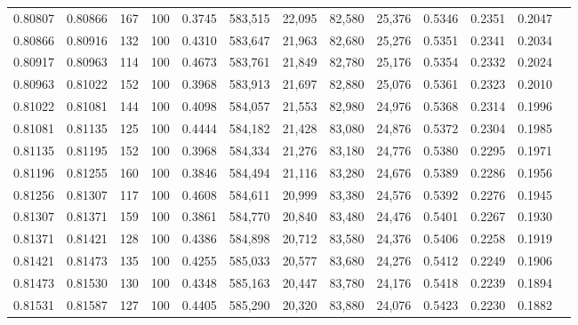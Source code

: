 \begin{tabular}{rrrrrrrrrrrrr}
0.80807 & 0.80866 &   167 & 100 &                                     0.3745 & 583,515 &  22,095 &  82,580 &  25,376 & 0.5346 & 0.2351 & 0.2047 \\
0.80866 & 0.80916 &   132 & 100 &                                     0.4310 & 583,647 &  21,963 &  82,680 &  25,276 & 0.5351 & 0.2341 & 0.2034 \\
0.80917 & 0.80963 &   114 & 100 &                                     0.4673 & 583,761 &  21,849 &  82,780 &  25,176 & 0.5354 & 0.2332 & 0.2024 \\
0.80963 & 0.81022 &   152 & 100 &                                     0.3968 & 583,913 &  21,697 &  82,880 &  25,076 & 0.5361 & 0.2323 & 0.2010 \\
0.81022 & 0.81081 &   144 & 100 &                                     0.4098 & 584,057 &  21,553 &  82,980 &  24,976 & 0.5368 & 0.2314 & 0.1996 \\
0.81081 & 0.81135 &   125 & 100 &                                     0.4444 & 584,182 &  21,428 &  83,080 &  24,876 & 0.5372 & 0.2304 & 0.1985 \\
0.81135 & 0.81195 &   152 & 100 &                                     0.3968 & 584,334 &  21,276 &  83,180 &  24,776 & 0.5380 & 0.2295 & 0.1971 \\
0.81196 & 0.81255 &   160 & 100 &                                     0.3846 & 584,494 &  21,116 &  83,280 &  24,676 & 0.5389 & 0.2286 & 0.1956 \\
0.81256 & 0.81307 &   117 & 100 &                                     0.4608 & 584,611 &  20,999 &  83,380 &  24,576 & 0.5392 & 0.2276 & 0.1945 \\
0.81307 & 0.81371 &   159 & 100 &                                     0.3861 & 584,770 &  20,840 &  83,480 &  24,476 & 0.5401 & 0.2267 & 0.1930 \\
0.81371 & 0.81421 &   128 & 100 &                                     0.4386 & 584,898 &  20,712 &  83,580 &  24,376 & 0.5406 & 0.2258 & 0.1919 \\
0.81421 & 0.81473 &   135 & 100 &                                     0.4255 & 585,033 &  20,577 &  83,680 &  24,276 & 0.5412 & 0.2249 & 0.1906 \\
0.81473 & 0.81530 &   130 & 100 &                                     0.4348 & 585,163 &  20,447 &  83,780 &  24,176 & 0.5418 & 0.2239 & 0.1894 \\
0.81531 & 0.81587 &   127 & 100 &                                     0.4405 & 585,290 &  20,320 &  83,880 &  24,076 & 0.5423 & 0.2230 & 0.1882 \\

\end{tabular}

